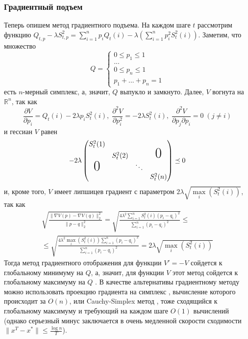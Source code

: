 \documentclass{article}
\begin{document}
\begin{enumerate}
\subsubsection{Градиентный подъем}
Теперь опишем метод градиентного подъема. На каждом шаге $t$ рассмотрим функцию $Q_{t,p} - \lambda S_{t,p}^2 = \sum_{i=1}^n p_i Q_t(i) - \lambda \left( \sum_{i=1}^n p_i^2 S_t^2(i)\right)$. Заметим, что множество
     $$
     Q =
        \begin{cases}
           0 \leq p_1 \leq 1 \\
            ... \\
            0 \leq p_{n} \leq 1 \\
            p_1 + ... + p_n = 1
        \end{cases}
        \label{eq:4}
     $$
     есть $n$-мерный симплекс, а, значит, $Q$ выпукло и замкнуто. Далее, $V$ вогнута на $\mathbb{R}^n$, так как
     $$
     \frac{\partial V}{\partial p_i} = Q_t(i) - 2\lambda p_i S_t^2(i), \;
     \frac{\partial^2 V}{\partial p_i^2} = -2\lambda S_t^2(i), \;
     \frac{\partial^2 V}{\partial p_j \partial p_i} = 0 \; (j \neq i)
     $$
    и гессиан $V$ равен
    $$
    -2\lambda
    \begin{pmatrix}
        S_t^2(1)        &          &        &                  \\
                        & S_t^2(2) &        & \text{\huge{0}}  \\
        \text{\huge{0}} &          & \ddots &                  \\
                        &          &        & S_t^2(n)
    \end{pmatrix}
    \preceq 0
    $$
    и, кроме того, $V$ имеет липшицев градиент с параметром $2\lambda \sqrt{\underset{i}{\max}(S_t^2(i))}$, так как 
    \begin{multline}
        \sqrt{\frac{\| \nabla V (p) - \nabla V (q) \|_2^2}{\| p - q \|_2^2}} = \sqrt{\frac{4\lambda^2 \sum_{i=1}^n S_t^2(i) (p_i - q_i)^2}{\sum_{i=1}^n (p_i - q_i)^2}} \leq \\ \leq \sqrt{\frac{4\lambda^2 \underset{i}{\max}(S_t^2(i)) \sum_{i=1}^n (p_i - q_i)^2}{\sum_{i=1}^n (p_i - q_i)^2}} = 2\lambda \sqrt{\underset{i}{\max}(S_t^2(i))}
    \end{multline}
    Тогда метод градиентного отображения для функции $V' = -V$ сойдется к глобальному минимуму на $Q$, а, значит, для функции $V$ этот метод сойдется к глобальному максимуму на $Q$ \cite{nesterov_convergence}. В качестве альтернативы градиентному методу можно использовать проекцию градиента на симплекс \cite{simplex_projection}, вычисление которого происходит за $O(n)$, или Cauchy-Simplex метод \cite{cauchy_simplex}, тоже сходящийся к глобальному максимуму и требующий на каждом шаге $O(1)$ вычислений (однако серьезный минус заключается в очень медленной скорости сходимости $\| x^T - x^*\| \leq \frac{\log n}{T}$).


\end{enumerate}
\end{document}
